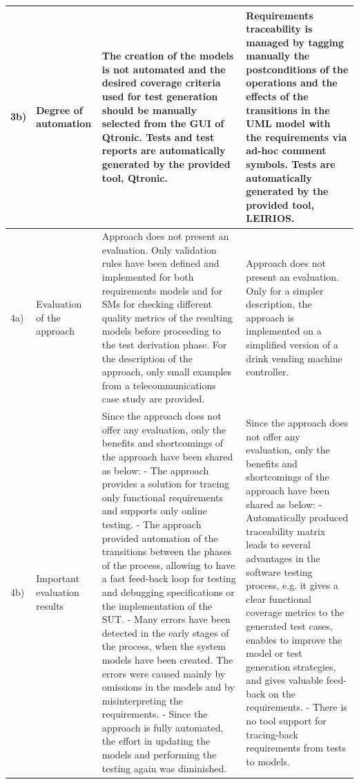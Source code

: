 \begin{landscape}
\begin{small}
\begin{longtable}{ p{0.5cm} | p{2.5cm} | p{9cm} | p{9cm} }
\hline
3b) & Degree of automation & The creation of the models is not automated and the desired coverage criteria used for test generation should be manually selected from the GUI of Qtronic. Tests and test reports are automatically generated by the provided tool, Qtronic. &Requirements traceability is managed by tagging manually the postconditions of the operations and the effects of the transitions in the UML model with the requirements via ad-hoc comment symbols. Tests are automatically generated by the provided tool, LEIRIOS.\\
\hline
4a) & Evaluation of the approach & Approach does not present an evaluation. Only validation rules have been defined and implemented for both requirements models and for SMs for checking different quality metrics of the resulting models before proceeding to the test derivation phase.
\newline For the description of the approach, only small examples from a telecommunications case study are provided. & Approach does not present an evaluation. Only for a simpler description, the approach is implemented on a simplified version of a drink vending machine controller.\\
\hline
4b) & Important evaluation results & Since the approach does not offer any evaluation, only the benefits and shortcomings of the approach have been shared as below:
\newline - The approach provides a solution for tracing only functional requirements and supports only online testing.
\newline - The approach provided automation of the transitions between the phases of the process, allowing to have a fast feed-back loop for testing and debugging specifications or the implementation of the SUT.
\newline - Many errors have been detected in the early stages of the process, when the system models have been created. The errors were caused mainly by omissions in the models and by misinterpreting the requirements.
\newline - Since the approach is fully automated, the effort in updating the models and performing the testing again was diminished.
 & Since the approach does not offer any evaluation, only the benefits and shortcomings of the approach have been shared as below:
 \newline - Automatically produced traceability matrix leads to several advantages in the software testing process, e.g. it gives a clear functional coverage metrics to the generated test cases, enables to improve the model or test generation strategies, and gives valuable feed-back on the requirements.
 \newline - There is no tool support for tracing-back requirements from tests to models.\\
\hline
\end{longtable}
\end{small}
\end{landscape} 
\restoregeometry


